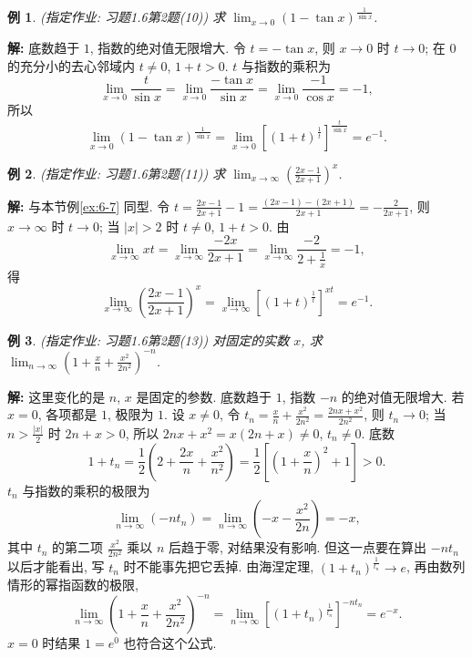 \documentclass[UTF8,openany]{ctexbook}
\theoremstyle{chinesetextbook}
\newtheorem{example}{例}[section]
\newenvironment{cnsolution}{\par\indent\textbf{解:} \ignorespaces}{\par}
\begin{document}
\begin{example}
\textnormal{(指定作业: 习题1.6第2题(10))} 求 $\displaystyle\lim_{x\to0}(1-\tan x)^{\frac1{\sin x}}$.
\end{example}
\begin{cnsolution}
底数趋于 $1$, 指数的绝对值无限增大. 令 $t=-\tan x$, 则 $x\to0$ 时 $t\to0$; 在 $0$ 的充分小的去心邻域内 $t\ne0$, $1+t>0$. $t$ 与指数的乘积为
\[
\lim_{x\to0}\frac t{\sin x}=\lim_{x\to0}\frac{-\tan x}{\sin x}=\lim_{x\to0}\frac{-1}{\cos x}=-1,
\]
所以
\[
\lim_{x\to0}(1-\tan x)^{\frac1{\sin x}}=\lim_{x\to0}\left[(1+t)^{\frac1t}\right]^{\frac t{\sin x}}=e^{-1}.
\]
\end{cnsolution}
\begin{example}
\textnormal{(指定作业: 习题1.6第2题(11))} 求 $\displaystyle\lim_{x\to\infty}\left(\frac{2x-1}{2x+1}\right)^x$.
\end{example}
\begin{cnsolution}
与本节例\ref{ex:6-7} 同型. 令 $\displaystyle t=\frac{2x-1}{2x+1}-1=\frac{(2x-1)-(2x+1)}{2x+1}=-\frac2{2x+1}$, 则 $x\to\infty$ 时 $t\to0$; 当 $|x|>2$ 时 $t\ne0$, $1+t>0$. 由
\[
\lim_{x\to\infty}xt=\lim_{x\to\infty}\frac{-2x}{2x+1}=\lim_{x\to\infty}\frac{-2}{2+\frac1x}=-1,
\]
得
\[
\lim_{x\to\infty}\left(\frac{2x-1}{2x+1}\right)^x=\lim_{x\to\infty}\left[(1+t)^{\frac1t}\right]^{xt}=e^{-1}.
\]
\end{cnsolution}
\begin{example}
\textnormal{(指定作业: 习题1.6第2题(13))} 对固定的实数 $x$, 求 $\displaystyle\lim_{n\to\infty}\left(1+\frac xn+\frac{x^2}{2n^2}\right)^{-n}$.
\end{example}
\begin{cnsolution}
这里变化的是 $n$, $x$ 是固定的参数. 底数趋于 $1$, 指数 $-n$ 的绝对值无限增大. 若 $x=0$, 各项都是 $1$, 极限为 $1$. 设 $x\ne0$, 令 $\displaystyle t_n=\frac xn+\frac{x^2}{2n^2}=\frac{2nx+x^2}{2n^2}$, 则 $t_n\to0$; 当 $\displaystyle n>\frac{|x|}2$ 时 $2n+x>0$, 所以 $2nx+x^2=x(2n+x)\ne0$, $t_n\ne0$. 底数
\[
1+t_n=\frac12\left(2+\frac{2x}n+\frac{x^2}{n^2}\right)=\frac12\left[\left(1+\frac xn\right)^2+1\right]>0.
\]
$t_n$ 与指数的乘积的极限为
\[
\lim_{n\to\infty}(-nt_n)=\lim_{n\to\infty}\left(-x-\frac{x^2}{2n}\right)=-x,
\]
其中 $t_n$ 的第二项 $\displaystyle\frac{x^2}{2n^2}$ 乘以 $n$ 后趋于零, 对结果没有影响. 但这一点要在算出 $-nt_n$ 以后才能看出, 写 $t_n$ 时不能事先把它丢掉. 由海涅定理, $\displaystyle(1+t_n)^{\frac1{t_n}}\to e$, 再由数列情形的幂指函数的极限,
\[
\lim_{n\to\infty}\left(1+\frac xn+\frac{x^2}{2n^2}\right)^{-n}=\lim_{n\to\infty}\left[(1+t_n)^{\frac1{t_n}}\right]^{-nt_n}=e^{-x}.
\]
$x=0$ 时结果 $1=e^0$ 也符合这个公式.
\end{cnsolution}
\end{document}
